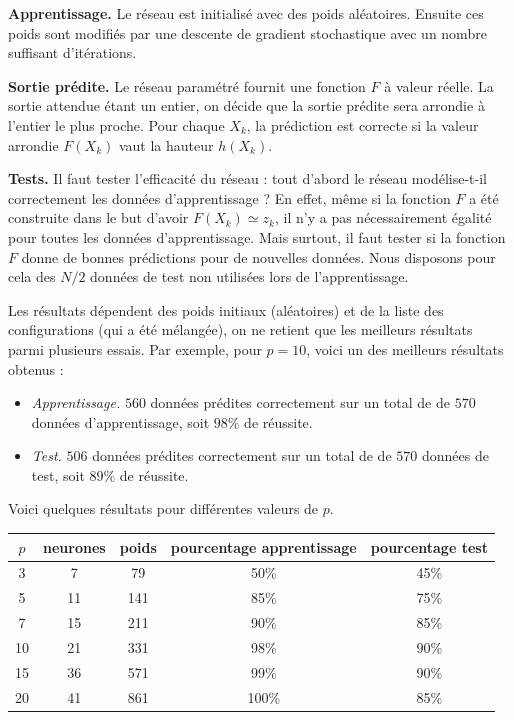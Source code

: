 \documentclass[11pt,class=report,crop=false]{standalone}
\begin{document}
\textbf{Apprentissage.}
Le réseau est initialisé avec des poids aléatoires. Ensuite ces poids sont modifiés par une descente de gradient stochastique avec un nombre suffisant d'itérations.

\textbf{Sortie prédite.}
Le réseau paramétré fournit une fonction $F$ à valeur réelle. La sortie attendue étant un entier, on décide que la sortie prédite sera arrondie à l'entier le plus proche.
Pour chaque $X_k$, la prédiction est correcte si la valeur arrondie $F(X_k)$ vaut la hauteur $h(X_k)$. 


\textbf{Tests.}
Il faut tester l'efficacité du réseau : tout d'abord le réseau modélise-t-il correctement les données d'apprentissage ? En effet, même si la fonction $F$ a été construite dans le but d'avoir $F(X_k) \simeq z_k$, il n'y a pas nécessairement égalité pour toutes les données d'apprentissage. Mais surtout, il faut tester si la fonction $F$ donne de bonnes prédictions pour de nouvelles données. Nous disposons pour cela des $N/2$ données de test non utilisées lors de l'apprentissage.

Les résultats dépendent des poids initiaux (aléatoires) et de la liste des configurations (qui a été mélangée), on ne retient que les meilleurs résultats parmi plusieurs essais.
Par exemple, pour $p=10$, voici un des meilleurs résultats obtenus :
\begin{itemize}
  \item \emph{Apprentissage.} $560$ données prédites correctement sur un total de de $570$ données d'apprentissage, soit $98\%$ de réussite.
  
  \item \emph{Test.} $506$ données prédites correctement sur un total de de $570$ données de test, soit $89\%$ de réussite.
\end{itemize}

Voici quelques résultats pour différentes valeurs de $p$.

\begin{center}
\begin{tabular}{c|c|c|c|c}
$p$ & {neurones} & {poids} & {pourcentage apprentissage} & {pourcentage test} \\ \hline
3 & 7 & 79 & 50\% & 45\% \\
5 & 11 & 141 & 85\% & 75\% \\
7 & 15 & 211 & 90\% & 85\% \\
10 & 21 & 331 & 98\% & 90\% \\
15 & 36 & 571 & 99\% & 90\% \\
20 & 41 & 861 & 100\% & 85\% \\
\end{tabular}
\end{center}
\end{document}
